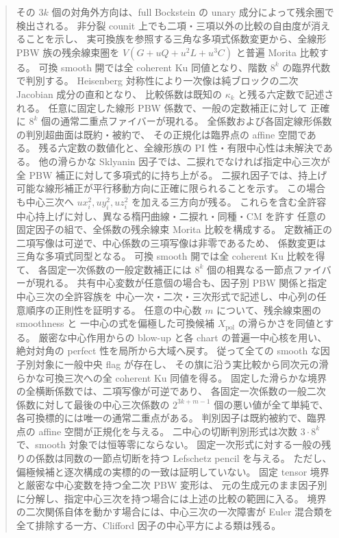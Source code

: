 \begin{abstract}
その $3k$ 個の対角外方向は、full Bockstein の unary 成分によって残余圏で検出される。
非分裂 counit 上でも二項・三項以外の比較の自由度が消えることを示し、
実可換族を参照する三角な多項式係数変更から、全線形 PBW 族の残余線束圏を
$V(G+uQ+u^2L+u^3C)$ と普遍 Morita 比較する。
可換 smooth 開では全 coherent Ku 同値となり、階数 $8^k$ の臨界代数で判別する。
Heisenberg 対称性により一次像は純ブロックの二次 Jacobian 成分の直和となり、
比較係数は既知の $\kappa_k$ と残る六定数で記述される。
任意に固定した線形 PBW 係数で、一般の定数補正に対して
正確に $8^k$ 個の通常二重点ファイバーが現れる。
全係数および各固定線形係数の判別超曲面は既約・被約で、
その正規化は臨界点の affine 空間である。
残る六定数の数値化と、全線形族の PI 性・有限中心性は未解決である。
他の滑らかな Sklyanin 因子では、二捩れでなければ指定中心三次が
全 PBW 補正に対して多項式的に持ち上がる。
二捩れ因子では、持上げ可能な線形補正が平行移動方向に正確に限られることを示す。
この場合も中心三次へ $u x_i^2,u y_i^2,u z_i^2$ を加える三方向が残る。
これらを含む全許容中心持上げに対し、異なる楕円曲線・二捩れ・同種・CM を許す
任意の固定因子の組で、全係数の残余線束 Morita 比較を構成する。
定数補正の二項写像は可逆で、中心係数の三項写像は非零であるため、
係数変更は三角な多項式同型となる。
可換 smooth 開では全 coherent Ku 比較を得て、
各固定一次係数の一般定数補正には $8^k$ 個の相異なる一節点ファイバーが現れる。
共有中心変数が任意個の場合も、因子別 PBW 関係と指定中心三次の全許容族を
中心一次・二次・三次形式で記述し、中心列の任意順序の正則性を証明する。
任意の中心数 $m$ について、残余線束圏の smoothness と
一中心の式を偏極した可換候補 $X_{\mathrm{pol}}$ の滑らかさを同値とする。
厳密な中心作用からの blow-up と各 chart の普遍一中心核を用い、
絶対対角の perfect 性を局所から大域へ戻す。
従って全ての smooth な因子別対象に一般中央 flag が存在し、
その旗に沿う実比較から同次元の滑らかな可換三次への全 coherent Ku 同値を得る。
固定した滑らかな境界の全横断係数では、二項写像が可逆であり、
各固定一次係数の一般二次係数に対して最後の中心三次係数の
$2^{3k+m-1}$ 個の悪い値が全て単純で、各可換標的には唯一の通常二重点がある。
判別因子は既約被約で、臨界点の affine 空間が正規化を与える。
二中心の切断判別形式は次数 $3\cdot8^k$ で、smooth 対象では恒等零にならない。
固定一次形式に対する一般の残りの係数は同数の一節点切断を持つ Lefschetz pencil を与える。
ただし、偏極候補と逐次構成の実標的の一致は証明していない。
固定 tensor 境界と厳密な中心変数を持つ全二次 PBW 変形は、
元の生成元のまま因子別に分解し、指定中心三次を持つ場合には上述の比較の範囲に入る。
境界の二次関係自体を動かす場合には、中心三次の一次障害が
Euler 混合類を全て排除する一方、Clifford 因子の中心平方による類は残る。

\end{abstract}
